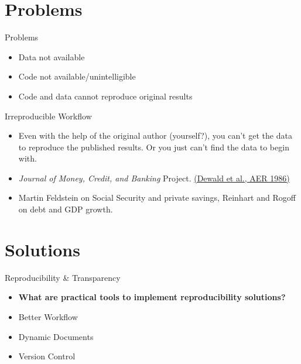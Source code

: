 \documentclass{beamer}
\begin{document}
\section{Problems}
\begin{frame}{Problems}
 \begin{itemize}
 \item Data not available
 \item Code not available/unintelligible
 \item Code and data cannot reproduce original results
 \end{itemize}
\end{frame}

 \begin{frame}{Irreproducible Workflow}
 \begin{itemize}
 \item
  Even with the help of the original author (yourself?), you can't get the data to reproduce the published results. Or you just can't find the data to begin with. 
  \item \textit{Journal of Money, Credit, and Banking} Project. \href{http://www.jstor.org/stable/1806061}{(Dewald et al., AER 1986)}
   \item Martin Feldstein on Social Security and private savings, Reinhart and Rogoff on debt and GDP growth.
 \end{itemize} 
 \end{frame}
\section{Solutions}

\begin{frame}{Reproducibility \& Transparency}
\begin{itemize}
\item \textbf{What are practical tools to implement reproducibility solutions?}
\end{itemize}
\end{frame}

\begin{frame}
 \begin{itemize}
 \item Better Workflow
 \item Dynamic Documents
 \item Version Control
\end{itemize}
\end{frame}
\end{document}
